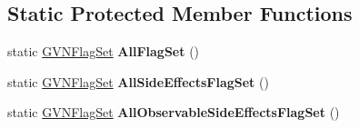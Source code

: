 \subsection*{Static Protected Member Functions}
\begin{DoxyCompactItemize}
\item 
\hypertarget{classv8_1_1internal_1_1_h_value_ab4c5d0e61acf3c9edf35545cfb3c78b1}{}static \hyperlink{classv8_1_1internal_1_1_enum_set}{G\+V\+N\+Flag\+Set} {\bfseries All\+Flag\+Set} ()\label{classv8_1_1internal_1_1_h_value_ab4c5d0e61acf3c9edf35545cfb3c78b1}

\item 
\hypertarget{classv8_1_1internal_1_1_h_value_ad9f87c0bc07ff6317b6fea3ee9896ecc}{}static \hyperlink{classv8_1_1internal_1_1_enum_set}{G\+V\+N\+Flag\+Set} {\bfseries All\+Side\+Effects\+Flag\+Set} ()\label{classv8_1_1internal_1_1_h_value_ad9f87c0bc07ff6317b6fea3ee9896ecc}

\item 
\hypertarget{classv8_1_1internal_1_1_h_value_a4fbae5809126b5aa755ae69841dda7fd}{}static \hyperlink{classv8_1_1internal_1_1_enum_set}{G\+V\+N\+Flag\+Set} {\bfseries All\+Observable\+Side\+Effects\+Flag\+Set} ()\label{classv8_1_1internal_1_1_h_value_a4fbae5809126b5aa755ae69841dda7fd}

\end{DoxyCompactItemize}
